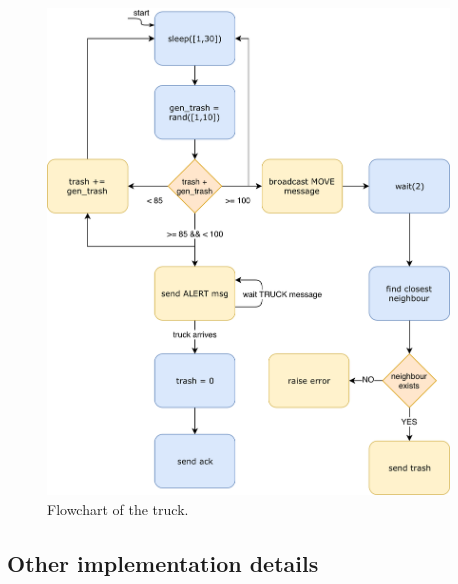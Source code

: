 \documentclass[a4paper, 11pt, parskip=half]{scrartcl}
\begin{document}
\begin{figure}[H]
\begin{minipage}[t]{0.5\textwidth}
        \includegraphics[width=0.95\textwidth]{resources/bin_flow_chart}
        \caption{Flowchart of the truck.}
        \label{fig:bin-flow}
    \end{minipage}
\end{figure}

\newpage
\subsection{Other implementation details}
\end{document}
